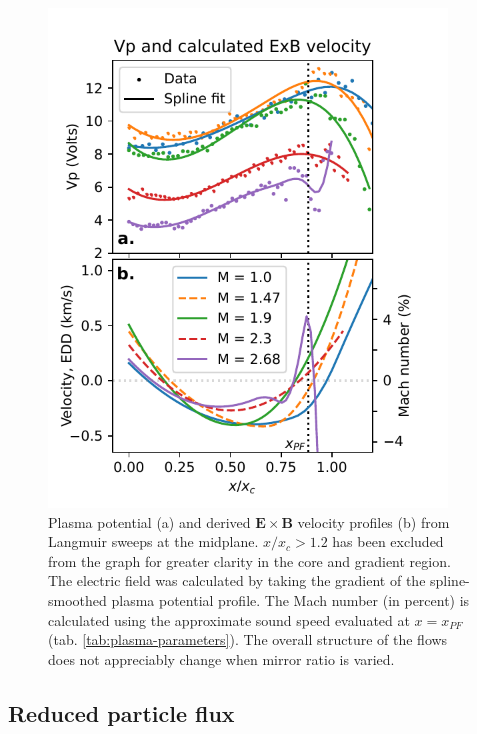 \begin{figure}
    \centering
    \includegraphics[width=300pt]{figures/fig6.pdf}
    \caption[Plasma potential and derived $\boldsymbol{E \times B}$ velocity profiles]{Plasma potential (a) and derived $\boldsymbol{E \times B}$ velocity profiles (b) from Langmuir sweeps at the midplane. $x/x_c > 1.2$ has been excluded from the graph for greater clarity in the core and gradient region. The electric field was calculated by taking the gradient of the spline-smoothed plasma potential profile. The Mach number (in percent) is calculated using the approximate sound speed evaluated at $x=x_{PF}$ (tab. \ref{tab:plasma-parameters}). The overall structure of the flows does not appreciably change when mirror ratio is varied.}
    \label{fig:Vp_ExB}
\end{figure}

\subsection{Reduced particle flux}

